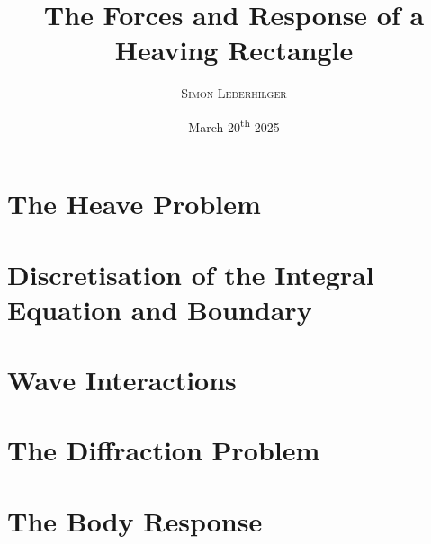 \documentclass{article}
\title{The Forces and Response of a Heaving Rectangle}
\subtitle{\emph{\headcourse}}
\author{\textsc{Simon Lederhilger}}
\date{March 20\textsuperscript{th} 2025}
\begin{document}
\maketitle\thispagestyle{fancy}
    \begin{multicols*}{2}
        \section[Heave]{The Heave Problem}
        

        \section[Discretizations]{Discretisation of the Integral Equation and Boundary}
        

        \section[Waves]{Wave Interactions}
        

        \section[Diffraction]{The Diffraction Problem}
        

        \section[Response]{The Body Response}
        
    \end{multicols*}
\end{document}
